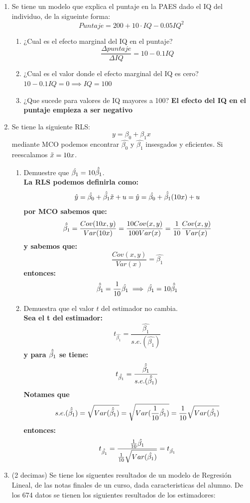 \documentclass[10pt,a4paper]{article}
\begin{document}
\begin{enumerate}
\item Se tiene un modelo que explica el puntaje en la PAES dado el IQ del individuo, de la sigueinte forma:
$$Puntaje = 200 + 10 \cdot IQ -  0.05IQ^2$$
\begin{enumerate}
    \item ¿Cual es el efecto marginal del IQ en el puntaje?
    \textbf{$$\frac{\Delta puntaje}{\Delta IQ} = 10-0.1IQ$$ }
    \item ¿Cual es el valor donde el efecto marginal del IQ es cero?
    \textbf{$10-0.1IQ=0 \implies IQ = 100$}
    \item ¿Que sucede para valores de IQ mayores a 100?
    \textbf{El efecto del IQ en el puntaje empieza a ser negativo}
\end{enumerate}

\item Se tiene la siguiente RLS:
$$y = \beta_0 + \beta_1x$$
mediante MCO podemos encontrar $\hat{\beta_0}$ y $\hat{\beta_1}$ insesgados y eficientes. Si reescalamos $\Tilde{x} = 10x$. 
\begin{enumerate}
    \item Demuestre que $\hat{\beta_1}=10\hat{\Tilde{\beta_1}}$. \\
    \textbf{La RLS podemos definirla como:
    $$\hat{y} = \hat{\beta_0} + \hat{\Tilde{\beta_1}}\Tilde{x}+u = \hat{y} = \hat{\beta_0} + \hat{\Tilde{\beta_1}}(10x)+u$$
    por MCO sabemos que:
    $$\hat{\Tilde{\beta_1}}=\frac{Cov(10x,y)}{Var(10x)}=\frac{10Cov(x,y)}{100Var(x)}=\frac{1}{10}\frac{Cov(x,y)}{Var(x)}$$
    y sabemos que:
    $$\frac{Cov(x,y)}{Var(x)} = \hat{\beta_1}$$
    entonces:
    $$\hat{\Tilde{\beta_1}} = \frac{1}{10}\hat{\beta_1} \implies \hat{\beta_1} = 10\hat{\Tilde{\beta_1}}$$}
\item Demuestra que el valor $t$ del estimador no cambia. \\
\textbf{ Sea el t del estimador:
$$t_{\hat{\beta_1}} = \frac{\hat{\beta_1}}{s.e.(\hat{\beta_1})}$$
y para $\hat{\Tilde{\beta_1}}$ se tiene:
$$t_{\hat{\Tilde{\beta_1}}} = \frac{\hat{\Tilde{\beta_1}}}{s.e.(\hat{\Tilde{\beta_1}})}$$
Notames que 
$$s.e.(\hat{\Tilde{\beta_1}}) = \sqrt{Var(\hat{\Tilde{\beta_1}})}=\sqrt{Var(\frac{1}{10}\hat{{\beta_1}})}=\frac{1}{10}\sqrt{Var(\hat{{\beta_1}})}$$
entonces:
$$t_{\hat{\Tilde{\beta_1}}} = \frac{\frac{1}{10}\hat{{\beta_1}}}{\frac{1}{10}\sqrt{Var(\hat{{\beta_1}})}} = t_{\hat{\beta_1}}$$
}
    
\end{enumerate}

\item (2 decimas) Se tiene los siguentes resultados de un modelo de Regresión Lineal, de las notas finales de un curso, dada caracteristicas del alumno. De los 674 datos se tienen los siguientes resultados de los estimadores:


\end{enumerate}
\end{document}

